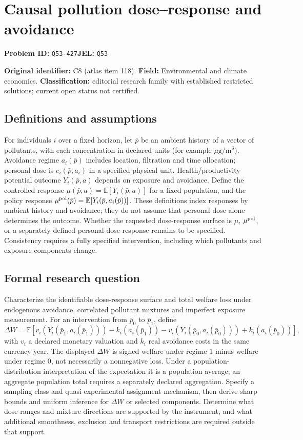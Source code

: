 \documentclass[11pt,a4paper]{article}
\begin{document}
\section*{Causal pollution dose–response and avoidance}
\textbf{Problem ID:} \texttt{Q53-427}\quad \textbf{JEL:} \texttt{Q53}\par
\label{problem:OP-0118}
\label{atlas:prob:C8}

\noindent\textbf{Original identifier:} C8 (atlas item 118). \textbf{Field:} Environmental and climate economics. \textbf{Classification:} editorial research family with established restricted solutions; current open status not certified.

\subsection*{Definitions and assumptions}

For individuals $i$ over a fixed horizon, let $\bar p$ be an ambient history of a vector of pollutants, with each concentration in declared units (for example $\mu\mathrm g/\mathrm m^3$). Avoidance regime $a_i(\bar p)$ includes location, filtration and time allocation; personal dose is $e_i(\bar p,a_i)$ in a specified physical unit. Health/productivity potential outcome $Y_i(\bar p,a)$ depends on exposure and avoidance. Define the controlled response $\mu(\bar p,a)=\mathbb E[Y_i(\bar p,a)]$ for a fixed population, and the policy response $\mu^{\rm pol}(\bar p)=\mathbb E[Y_i(\bar p,a_i(\bar p))]$. These definitions index responses by ambient history and avoidance; they do not assume that personal dose alone determines the outcome. Whether the requested dose-response surface is $\mu$, $\mu^{\rm pol}$, or a separately defined personal-dose response remains to be specified. Consistency requires a fully specified intervention, including which pollutants and exposure components change.

\subsection*{Formal research question}

Characterize the identifiable dose-response surface and total welfare loss under endogenous avoidance, correlated pollutant mixtures and imperfect exposure measurement. For an intervention from $\bar p_0$ to $\bar p_1$, define
\[
\Delta W=\mathbb E\!\left[
v_i(Y_i(\bar p_1,a_i(\bar p_1)))-k_i(a_i(\bar p_1))
-v_i(Y_i(\bar p_0,a_i(\bar p_0)))+k_i(a_i(\bar p_0))
\right],
\]
with $v_i$ a declared monetary valuation and $k_i$ real avoidance costs in the same currency year. The displayed $\Delta W$ is signed welfare under regime 1 minus welfare under regime 0, not necessarily a nonnegative loss. Under a population-distribution interpretation of the expectation it is a population average; an aggregate population total requires a separately declared aggregation. Specify a sampling class and quasi-experimental assignment mechanism, then derive sharp bounds and uniform inference for $\Delta W$ or selected components. Determine what dose ranges and mixture directions are supported by the instrument, and what additional smoothness, exclusion and transport restrictions are required outside that support.
\end{document}
